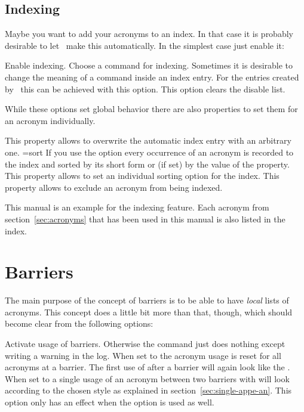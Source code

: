 \documentclass{acro-manual}
\begin{document}
\subsection{Indexing}\label{sec:indexing}
Maybe you want to add your acronyms to an index. In that case it is probably
desirable to let \acro\ make this automatically.  In the simplest case just
enable it:
\begin{options}
    Enable indexing.
    Choose a command for indexing.
    Sometimes it is desirable to change the meaning of a command inside an
    index entry.  For the entries created by \acro\ this can be achieved with
    this option.
    This option clears the disable list.
\end{options}
While these options set global behavior there are also properties to set them
for an acronym individually.
\begin{properties}
  \Default
    This property allows to overwrite the automatic index entry with an
    arbitrary one.
  \Default={sort}
    If you use the option  every occurrence of an acronym is
    recorded to the index and sorted by its short form or (if set) by the
    value of the  property.  This property allows to set an
    individual sorting option for the index.
    This property allows to exclude an acronym from being indexed.
\end{properties}
This manual is an example for the indexing feature.  Each acronym from
section~\vref{sec:acronyms} that has been used in this manual is also listed
in the index.


\section{Barriers}\label{sec:barriers}
The main purpose of the concept of barriers is to be able to have \emph{local}
lists of acronyms.  This concept does a little bit more than that, though,
which should become clear from the following options:
\begin{options}
    Activate usage of barriers.  Otherwise the command  just
    does nothing except writing a warning in the log.
    When set to  the acronym usage is reset for all acronyms at a
    barrier.  The first use of  after a barrier will again look like
    the .
    When set to  a single usage of an acronym between two barriers
    with  will look according to the chosen style as explained in
    section~\vref{sec:single-appe-an}.  This option only has an effect when
    the option  is used as well.
\end{options}
\end{document}
